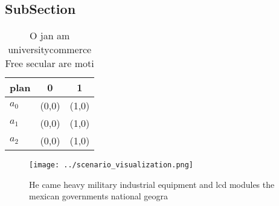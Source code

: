 \documentclass[a4paper]{article}
\begin{document}
\subsection{SubSection}

\begin{table}
\begin{adjustbox}{width=0.8\columnwidth}
\begin{tabular}{|l|l|l|}
\hline
\textbf{plan} & \multicolumn{1}{c|}{\textbf{0}} & \multicolumn{1}{c|}{\textbf{1}} \\ \hline
\textbf{$a_0$}  & (0,0) & (1,0) \\ \hline
\textbf{$a_1$}  & (0,0) & (1,0) \\ \hline
\textbf{$a_2$}  & (0,0) & (1,0) \\ \hline
\end{tabular}
\end{adjustbox}
\caption{O jan am universitycommerce Free secular are moti
}
\end{table}

\begin{figure}
\centering
\texttt{[image: ../scenario\_visualization.png]}
\caption{He came heavy military industrial equipment and lcd modules the mexican governments national geogra
}
\end{figure}
 
\end{document}
